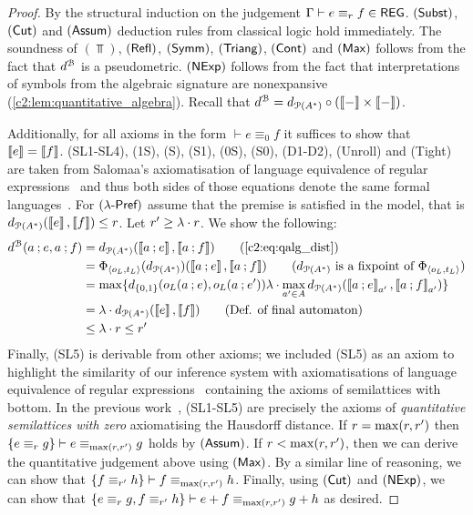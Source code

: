 \begin{proof}
By the structural induction on the judgement $\Gamma \vdash e \equiv_{r} f \in \mathsf{REG}$. $(\textsf{Subst})$, $(\textsf{Cut})$ and $(\textsf{Assum})$ deduction rules from classical logic hold immediately. The soundness of $(\Top)$, $(\textsf{Refl})$, $(\textsf{Symm})$, $(\textsf{Triang})$, $(\textsf{Cont})$ and $(\textsf{Max})$ follows from the fact that $d^{\mathcal{B}}$ is a pseudometric. $(\textsf{NExp})$ follows from the fact that interpretations of symbols from the algebraic signature are nonexpansive (\cref{c2:lem:quantitative_algebra}). Recall that $d^{\mathcal{B}} = d_{\mathcal{P}({A}^{\ast})} \circ (\left\llbracket{-}\right\rrbracket \times \left\llbracket{-}\right\rrbracket)$. 

 Additionally, for all axioms in the form $\vdash e \equiv_0 f$ it suffices to show that $\left\llbracket{e}\right\rrbracket = \left\llbracket{f}\right\rrbracket$. \textsf{(SL1-SL4)}, \textsf{(1S)}, \textsf{(S)}, \textsf{(S1)}, \textsf{(0S)}, \textsf{(S0)}, \textsf{(D1-D2)}, \textsf{(Unroll)} and \textsf{(Tight)} are taken from Salomaa's axiomatisation of language equivalence of regular expressions~\cite{Salomaa:1966:Two} and thus both sides of those equations denote the same formal languages~\cite[Theorem~5.2]{Wagemaker:2019:Completeness}. For $(\textsf{$\lambda$-Pref})$ assume that the premise is satisfied in the model, that is $d_{\mathcal{P}({A}^{\ast})}(\left\llbracket{e}\right\rrbracket,\left\llbracket{f}\right\rrbracket) \leq r$. Let $r' \geq \lambda \cdot r$. We show the following:
\begin{align*}
    d^{\qalgB}(a \seq e, a \seq f) &= \langmetric(\sem{a \seq e}, \sem{a \seq f}) \tag{\Cref{c2:eq:qalg_dist}}\\
    & = \Phi_{\langle o_L, t_L \rangle}(\langmetric)(\sem{a \seq e}, \sem{a \seq f}) \tag{$\langmetric$ is a fixpoint of $\Phi_{\langle o_L, t_L \rangle}$}\\
    &= \max\{d_{\{0,1\}}(o_L(a \seq e), o_L(a \seq e')) \lambda \cdot \max_{a' \in \alphabet}  \langmetric(\sem{a \seq e}_{a'}, \sem{a \seq f}_{a'} )\}\\
    &= \lambda \cdot \langmetric(\sem{e}, \sem{f}) \tag{Def. of final automaton} \\
    & \leq \lambda \cdot \e \leq \e' \\
\end{align*}
Finally, \textsf{(SL5)} is derivable from other axioms; we included \textsf{(SL5)} as an axiom to highlight the similarity of our inference system with axiomatisations of language equivalence of regular expressions~\cite{Salomaa:1966:Two,Kozen:1994:Completeness} containing the axioms of semilattices with bottom. In the previous work~\cite{Mardare:2016:Quantitative}, \textsf{(SL1-SL5)} are precisely the axioms of \emph{quantitative semilattices with zero} axiomatising the Hausdorff distance.  If $r = \max(r, r')$ then $\{e \equiv_r g \} \vdash e \equiv_{\max(r, r')} g$ holds by $(\textsf{Assum})$. If $r < \max(r, r')$, then we can derive the quantitative judgement above using $(\textsf{Max})$. By a similar line of reasoning, we can show that $\{f \equiv_{r'} h \} \vdash f \equiv_{\max(r, r')} h$. Finally, using $(\textsf{Cut})$ and $(\textsf{NExp})$, we can show that $\{e \equiv_{r} g, f \equiv_{r'} h\} \vdash e + f \equiv_{\max(r,r')} g + h$ as desired.
\end{proof}
